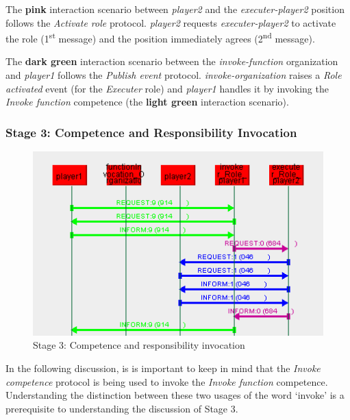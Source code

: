 The \textbf{pink} interaction scenario between \textit{player2} and the \textit{executer-player2} position follows the \textit{Activate role} protocol.
\textit{player2} requests \textit{executer-player2} to activate the role (1\textsuperscript{st} message) and the position immediately agrees (2\textsuperscript{nd} message).

The \textbf{dark green} interaction scenario between the \textit{invoke-function} organization and \textit{player1} follows the \textit{Publish event} protocol.
\textit{invoke-organization} raises a \textit{Role activated} event (for the \textit{Executer} role) and \textit{player1} handles it by invoking the \textit{Invoke function} competence (the \textbf{light green} interaction scenario).

\subsubsection*{Stage 3: Competence and Responsibility Invocation}

\begin{figure}[H]
	\centering
	\includegraphics[width=\textwidth]{images/examples/example1-stage3.png}
	\caption{Stage 3: Competence and responsibility invocation}
	\label{figure:example1-stage3}
\end{figure}

In the following discussion, is is important to keep in mind that the \textit{Invoke competence} protocol is being used to invoke the \textit{Invoke function} competence.
Understanding the distinction between these two usages of the word `invoke' is a prerequisite to understanding the discussion of Stage 3.

